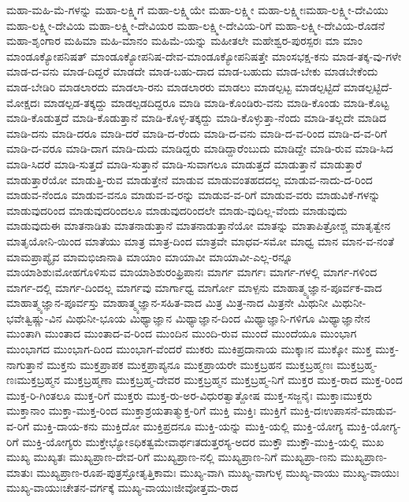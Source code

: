 {ಮಹಾ-ಮಹಿ-ಮೆ-ಗಳನ್ನು
ಮಹಾ-ಲಕ್ಷ್ಮಿಗೆ
ಮಹಾ-ಲಕ್ಷ್ಮಿಯೇ
ಮಹಾ-ಲಕ್ಷ್ಮೀ
ಮಹಾ-ಲಕ್ಷ್ಮೀಃಮಹಾ-ಲಕ್ಷ್ಮೀ-ದೇವಿಯು
ಮಹಾ-ಲಕ್ಷ್ಮೀ-ದೇವಿಯ
ಮಹಾ-ಲಕ್ಷ್ಮೀ-ದೇವಿಯರ
ಮಹಾ-ಲಕ್ಷ್ಮೀ-ದೇವಿಯ-ರಿಗೆ
ಮಹಾ-ಲಕ್ಷ್ಮೀ-ದೇವಿಯ-ರೊಡನೆ
ಮಹಾ-ಶೃಂಗಾರ
ಮಹಿಮಾ
ಮಹಿ-ಮಾನಂ
ಮಹಿಮೆ-ಯನ್ನು
ಮಹೀತಲೇ
ಮಹೇಶ್ವರ-ಪುರಸ್ಪರಃ
ಮಾ
ಮಾಂ
ಮಾಂಡೂಕ್ಯೋಪನಿಷತ್
ಮಾಂಡೂಕ್ಯೋಪನಿಷ-ದೇವ-ಮಾಂಡೂಕ್ಯೋಪನಿಷತ್ತೇ
ಮಾಂಸಭಕ್ಷ-ಕನು
ಮಾಡ-ತಕ್ಕ-ವು-ಗಳೇ
ಮಾಡ-ದ-ವನು
ಮಾಡ-ದಿದ್ದರೆ
ಮಾಡದೇ
ಮಾಡ-ಬಹು-ದಾದ
ಮಾಡ-ಬಹುದು
ಮಾಡ-ಬೇಕು
ಮಾಡಬೇಕೆಂದು
ಮಾಡ-ಬೇಡಿರಿ
ಮಾಡಲಾರದು
ಮಾಡಲಾ-ರನು
ಮಾಡಲಾರರು
ಮಾಡಲು
ಮಾಡಲ್ಪಟ್ಟ
ಮಾಡಲ್ಪಟ್ಟಿದೆ
ಮಾಡಲ್ಪಟ್ಟಿದೆ-ಮೋಕ್ಷದಃ
ಮಾಡಲ್ಪಡ-ತಕ್ಕದ್ದು
ಮಾಡಲ್ಪಡದಿದ್ದರೂ
ಮಾಡಿ
ಮಾಡಿ-ಕೊಂಡಿರು-ವನು
ಮಾಡಿ-ಕೊಂಡು
ಮಾಡಿ-ಕೊಟ್ಟ
ಮಾಡಿ-ಕೊಡುತ್ತದೆ
ಮಾಡಿ-ಕೊಡುತ್ತಾನೆ
ಮಾಡಿ-ಕೊಳ್ಳ-ತಕ್ಕದ್ದು
ಮಾಡಿ-ಕೊಳ್ಳುತ್ತಾ-ನೆಂದು
ಮಾಡಿ-ತಲ್ಲದೇ
ಮಾಡಿದ
ಮಾಡಿ-ದನು
ಮಾಡಿ-ದರೂ
ಮಾಡಿ-ದರೆ
ಮಾಡಿ-ದ-ರೆಂದು
ಮಾಡಿ-ದ-ವನು
ಮಾಡಿ-ದ-ವ-ರಿಂದ
ಮಾಡಿ-ದ-ವ-ರಿಗೆ
ಮಾಡಿ-ದ-ವರೂ
ಮಾಡಿ-ದಾಗ
ಮಾಡಿ-ದುದು
ಮಾಡಿದ್ದರು
ಮಾಡಿದ್ದಾರೆಂಬುದು
ಮಾಡಿದ್ದೇ
ಮಾಡಿ-ರುವ
ಮಾಡಿ-ಸಿದ
ಮಾಡಿ-ಸಿದರೆ
ಮಾಡಿ-ಸುತ್ತದೆ
ಮಾಡಿ-ಸುತ್ತಾನೆ
ಮಾಡಿ-ಸುವಾಗಲೂ
ಮಾಡುತ್ತದೆ
ಮಾಡುತ್ತಾನೆ
ಮಾಡುತ್ತಾರೆ
ಮಾಡುತ್ತಾರೆಯೋ
ಮಾಡುತ್ತಿ-ರುವ
ಮಾಡುತ್ತೇನೆ
ಮಾಡುವ
ಮಾಡುವಂತಹದದಲ್ಲ
ಮಾಡುವ-ನಾದು-ದ-ರಿಂದ
ಮಾಡುವ-ನೆಂದೂ
ಮಾಡುವ-ವನೂ
ಮಾಡುವ-ವ-ರನ್ನು
ಮಾಡುವ-ವ-ರಿಗೆ
ಮಾಡುವ-ವರು
ಮಾಡುವಿಕೆ-ಗಳನ್ನು
ಮಾಡುವುದರಿಂದ
ಮಾಡುವುದರಿಂದಲೂ
ಮಾಡುವುದರಿಂದಲೇ
ಮಾಡು-ವುದಿಲ್ಲ-ವೆಂದು
ಮಾಡುವುದು
ಮಾಡುವುದುಈ
ಮಾತನಾಡಿತು
ಮಾತನಾಡುತ್ತಾನೆ
ಮಾತನಾಡುತ್ತಾನೆಯೋ
ಮಾತನ್ನು
ಮಾತಾಪಿತ್ರೋಶ್ಚ
ಮಾತೃತ್ವೇನ
ಮಾತೃಯೋನಿ-ಯಿಂದ
ಮಾತೆಯು
ಮಾತ್ರ
ಮಾತ್ರ-ದಿಂದ
ಮಾತ್ರವೇ
ಮಾಧವ-ಸಮೋ
ಮಾಧ್ವ
ಮಾನ
ಮಾನ-ವ-ನಂತೆ
ಮಾಮಪ್ರಾಪ್ಯೈವ
ಮಾಮಭಿಜಾನಾತಿ
ಮಾಯಾಂ
ಮಾಯಾವೀ
ಮಾಯಾವೀ-ಎಲ್ಲ-ರನ್ನೂ
ಮಾಯಾಶಿಶುಃಮೋಹಗೊಳಿಸುವ
ಮಾಯಾಶಿಶುರಂಫ್ರಿಪಾನಃ
ಮಾರ್ಗ
ಮಾರ್ಗಃ
ಮಾರ್ಗ-ಗಳಲ್ಲಿ
ಮಾರ್ಗ-ಗಳಿಂದ
ಮಾರ್ಗ-ದಲ್ಲಿ
ಮಾರ್ಗ-ದಿಂದಲ್ಲ
ಮಾರ್ಗವು
ಮಾರ್ಗಾಧ್ವ
ಮಾರ್ಗೋ
ಮಾಳ್ಪನು
ಮಾಹಾತ್ಮ್ಯಜ್ಞಾನ-ಪೂರ್ವಕ-ವಾದ
ಮಾಹಾತ್ಮ್ಯಜ್ಞಾನ-ಪೂರ್ವಸ್ತು
ಮಾಹಾತ್ಮ್ಯಜ್ಞಾನ-ಸಹಿತ-ವಾದ
ಮಿತ್ರ
ಮಿತ್ರ-ನಾದ
ಮಿತ್ರನೇ
ಮಿಥುನೀ
ಮಿಥುನೀ-ಭವೇತ್ವಿಷ್ಣು-ವಿನ
ಮಿಥುನೀ-ಭೂಯ
ಮಿಥ್ಯಾಜ್ಞಾನ
ಮಿಥ್ಯಾಜ್ಞಾನ-ದಿಂದ
ಮಿಥ್ಯಾಜ್ಞಾನಿ-ಗಳಿಗೂ
ಮಿಥ್ಯಾಜ್ಞಾನೇನ
ಮುಂತಾಗಿ
ಮುಂತಾದ
ಮುಂತಾದ-ವ-ರಿಂದ
ಮುಂದಿನ
ಮುಂದಿ-ರುವ
ಮುಂದೆ
ಮುಂದೆಯೂ
ಮುಂಭಾಗ
ಮುಂಭಾಗದ
ಮುಂಭಾಗ-ದಿಂದ
ಮುಂಭಾಗ-ವೆಂದರೆ
ಮುಕರು
ಮುಕಿಪ್ರದಾನಾಯ
ಮುಕ್ಕಾಃನ
ಮುಕ್ಕೋ
ಮುಕ್ತ
ಮುಕ್ತ-ನಾಗುತ್ತಾನೆ
ಮುಕ್ತನು
ಮುಕ್ತಪ್ರಾಪಕ
ಮುಕ್ತಪ್ರಾಪ್ಯನೂ
ಮುಕ್ತಪ್ರಾಯರೇ
ಮುಕ್ತಬ್ರಹನ
ಮುಕ್ತಬ್ರಹ್ಮಣಃ
ಮುಕ್ತಬ್ರಹ್ಮ-ಣಃಮುಕ್ತಬ್ರಹ್ಮನ
ಮುಕ್ತಬ್ರಹ್ಮಣಾ
ಮುಕ್ತಬ್ರಹ್ಮ-ದೇವರ
ಮುಕ್ತಬ್ರಹ್ಮನ
ಮುಕ್ತಬ್ರಹ್ಮ-ನಿಗೆ
ಮುಕ್ತರ
ಮುಕ್ತ-ರಾದ
ಮುಕ್ತ-ರಿಂದ
ಮುಕ್ತ-ರಿ-ಗಿಂತಲೂ
ಮುಕ್ತ-ರಿಗೆ
ಮುಕ್ತರು
ಮುಕ್ತ-ರು-ಅರ-ವಿಧುರತ್ವಾತ್ದೋಷ
ಮುಕ್ತ-ಸಜ್ಜನೈಃ
ಮುಕ್ತಾಃಮುಕ್ತರು
ಮುಕ್ತಾನಾಂ
ಮುಕ್ತಾ-ಮುಕ್ತ-ರಿಂದ
ಮುಕ್ತಾಶ್ರಯತಾತ್ಮುಕ್ತ-ರಿಗೆ
ಮುಕ್ತಿ
ಮುಕ್ತಿಃ
ಮುಕ್ತಿಗೆ
ಮುಕ್ತಿ-ದಃಉಪಾಸನೆ-ಮಾಡುವ-ವ-ರಿಗೆ
ಮುಕ್ತಿ-ದಾಯ-ಕನು
ಮುಕ್ತಿದೋ
ಮುಕ್ತಿಪ್ರದನೂ
ಮುಕ್ತಿ-ಯನ್ನು
ಮುಕ್ತಿ-ಯಲ್ಲಿ
ಮುಕ್ತಿ-ಯೋಗ್ಯ
ಮುಕ್ತಿ-ಯೋಗ್ಯ-ರಿಗೆ
ಮುಕ್ತಿ-ಯೋಗ್ಯರು
ಮುಕ್ತೇಭ್ಯೋಽಧಿಕತ್ವಮೇವಾರ್ಥಃತದುತ್ತರಸ್ಯ-ಅದರ
ಮುಕ್ತೌ
ಮುಕ್ತೌ-ಮುಕ್ತಿ-ಯಲ್ಲಿ
ಮುಖ
ಮುಖ್ಯ
ಮುಖ್ಯತಃ
ಮುಖ್ಯಪ್ರಾಣ-ದೇವ-ರಿಗೆ
ಮುಖ್ಯಪ್ರಾಣ-ನಲ್ಲಿ
ಮುಖ್ಯಪ್ರಾಣ-ನಿಗೆ
ಮುಖ್ಯಪ್ರಾ-ಣನು
ಮುಖ್ಯಪ್ರಾಣ-ಮಾತುಃ
ಮುಖ್ಯಪ್ರಾಣ-ರೂಪ-ಪುತ್ರಸ್ತೋತೃತ್ತಿಕಾಮಃ
ಮುಖ್ಯ-ವಾಗಿ
ಮುಖ್ಯ-ವಾಗುಳ್ಳ
ಮುಖ್ಯ-ವಾಯು
ಮುಖ್ಯ-ವಾಯುಃ
ಮುಖ್ಯ-ವಾಯುಃಚೇತನ-ವರ್ಗಕ್ಕೆ
ಮುಖ್ಯ-ವಾಯುಃಜೀವೋತ್ತಮ-ರಾದ
}
